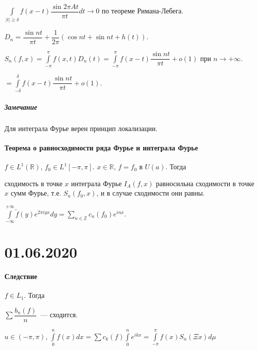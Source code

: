 \documentclass{article}
\begin{document}
            $\int\limits_{|t| \geqslant \delta} f(x - t) \dfrac{\sin 2 \pi A t}{\pi t} dt \rightarrow 0$ по теореме Римана-Лебега.
            
    $D_n = \dfrac{\sin {nt}}{\pi t} + \dfrac{1}{2 \pi} (\cos {nt} + \sin {nt} + h(t))$.
    
    $S_n(f, x) = \int\limits^{\pi}_{-\pi} f(x, t) D_n(t) = \int\limits^{\pi}_{-\pi} f(x - t) \dfrac{\sin nt}{\pi t} + o(1)$ при $n \rightarrow +\infty$.
    
    $= \int\limits^{\delta}_{-\delta} f(x - t) \dfrac{\sin {nt}}{\pi t} + o(1)$.
            
        \subsubsection{Замечание}
        
            Для интеграла Фурье верен принцип локализации.
            
    \subsection{Теорема о равносходимости ряда Фурье и интеграла Фурье}
    
        $f \in L^1 \left( \mathbb{R} \right)$, $f_0 \in L^1 [-\pi, \pi]$. $x \in \mathbb{R}$, $f = f_0$ в $U(a)$. Тогда
        
        сходимость в точке $x$ интеграла Фурье $I_A(f, x)$ равносильна сходимости в точке $x$ сумм Фурье, т.е. $S_n(f_0, x)$, и в случае сходимости они равны.
        
        $\int\limits^{+\infty}_{-\infty} \widetilde{f}(y) e^{2 \pi i y x} dy = \sum\limits_{n \in \mathbb{Z}} c_n(f_0) e^{i nx}$.
        
\newpage

\part{01.06.2020}

    \subsection{Следствие}
    
        $f \in L_1$. Тогда
        
        $\sum \dfrac{b_n(f)}{n}$~--- сходится.
        
        $u \in (-\pi, \pi)$, $\int\limits^n_0 f(x) dx = \sum c_k(f) \int\limits_0^n e^{ikx} = \int\limits^{\pi}_{-\pi} f(x) S_n(\Xi x) d \mu$
        
\end{document}
